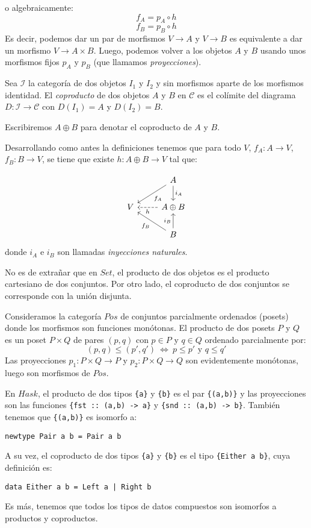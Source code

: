 \documentclass[12pt, twoside]{book}
\newcommand{\newterm}[1]{\index{#1}\emph{#1}}
\newcommand{\code}[1]{\Verb+{#1}+}
\newcommand{\cat}{{\mathcal{C}}}
\newcommand{\Set}{{Set}}
\newcommand{\Hask}{{Hask}}
\newcommand{\sii}{{\ \Leftrightarrow\ }}
\begin{document}
o algebraicamente:
\[ f_A = p_A \circ h \]
\[ f_B = p_B \circ h \]
Es decir, podemos dar un par de morfismos $V \to A$ y $V \to B$ es equivalente a dar un morfismo $V \to A \times B$.
Luego, podemos volver a los objetos $A$ y $B$ usando unos morfismos fijos $p_A$ y $p_B$ (que llamamos \emph{proyecciones}).

\begin{definition}
Sea $\mathcal{I}$ la categoría de dos objetos $I_1$ y $I_2$ y sin morfismos aparte de los morfismos identidad. El \newterm{coproducto} de dos objetos $A$ y $B$ en $\cat$ es el colímite del diagrama $D \colon \mathcal{I} \to \cat$ con $D(I_1) = A$ y $D(I_2) = B$.

Escribiremos $A \oplus B$ para denotar el coproducto de $A$ y $B$.
\end{definition}

Desarrollando como antes la definiciones tenemos que para todo $V$, $f_A \colon A \to V$, $f_B \colon B \to V$, se tiene que existe $h \colon A \oplus B \to V$ tal que:

\[\begin{tikzcd}
 & A \arrow[dl,"f_A"] \arrow[d,"i_A"]\\
V & A \oplus B \arrow[l,dashed,"h"]\\
 & B \arrow[ul,"f_B"] \arrow[u,"i_B"]
\end{tikzcd}\]
donde $i_A$ e $i_B$ son llamadas \newterm{inyecciones naturales}.

\begin{example}
No es de extrañar que en $\Set$, el producto de dos objetos es el producto cartesiano de dos conjuntos.
Por otro lado, el coproducto de dos conjuntos se corresponde con la unión disjunta.
\end{example}

\begin{example}\label{ejemplo-producto-pos}
Consideramos la categoría $Pos$ de conjuntos parcialmente ordenados (posets) donde los morfismos son funciones monótonas.
El producto de dos posets $P$ y $Q$ es un poset $P \times Q$ de pares $(p,q)$ con $p \in P$ y $q \in Q$ ordenado parcialmente por:
\[ (p,q) \leq (p',q') \sii p \leq p' \text{ y }q \leq q' \]
Las proyecciones $p_1 \colon P \times Q \to P$ y $p_2 \colon P \times Q \to Q$ son evidentemente monótonas, luego son morfismos de $Pos$.
\end{example}

\begin{example}
En $\Hask$, el producto de dos tipos \code{a} y \code{b} es el par \code{(a,b)} y las proyecciones son las funciones \code{fst :: (a,b) -> a} y \code{snd :: (a,b) -> b}.
También tenemos que \code{(a,b)} es isomorfo a:
\begin{verbatim}
newtype Pair a b = Pair a b
\end{verbatim}
A su vez, el coproducto de dos tipos \code{a} y \code{b} es el tipo \code{Either a b}, cuya definición es:
\begin{verbatim}
data Either a b = Left a | Right b
\end{verbatim}
Es más, tenemos que todos los tipos de datos compuestos son isomorfos a productos y coproductos.
\end{example}
\end{document}
